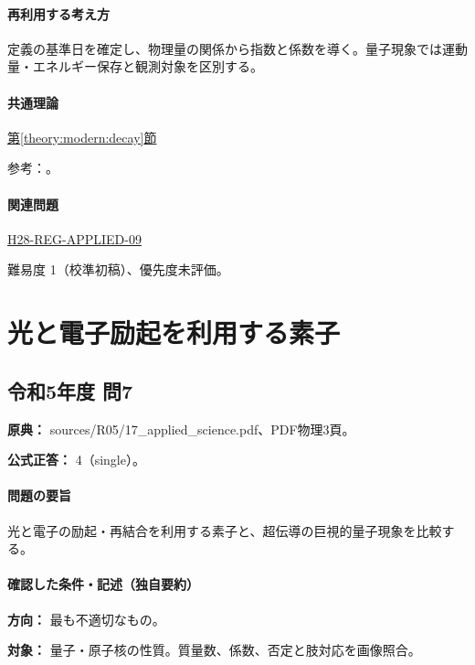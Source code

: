 \paragraph{再利用する考え方} 定義の基準日を確定し、物理量の関係から指数と係数を導く。量子現象では運動量・エネルギー保存と観測対象を区別する。

\paragraph{共通理論} \hyperref[theory:modern:decay]{第\ref*{theory:modern:decay}節}

\par 参考：\cite{modern_mit_nuclear}。

\paragraph{関連問題} \hyperref[q:h28-reg-applied-09]{H28-REG-APPLIED-09}

\par 難易度 1（校準初稿）、優先度未評価。

\section{光と電子励起を利用する素子}

\subsection{令和5年度 問7}
\label{q:r05-reg-applied-07}

\noindent\textbf{原典：} sources/R05/17\_applied\_science.pdf、PDF物理3頁。

\textbf{公式正答：} 4（single）。

\paragraph{問題の要旨} 光と電子の励起・再結合を利用する素子と、超伝導の巨視的量子現象を比較する。

\paragraph{確認した条件・記述（独自要約）}\mbox{}\par

\noindent\textbf{方向：} 最も不適切なもの。\par

\noindent\textbf{対象：} 量子・原子核の性質。質量数、係数、否定と肢対応を画像照合。\par

